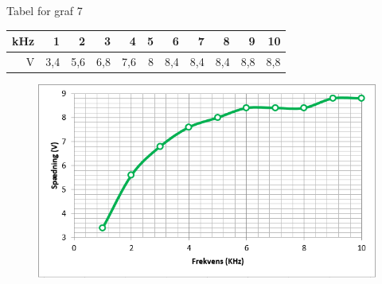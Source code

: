 Tabel for graf 7

\begin{tabular}{|r|r|r|r|r|r|r|r|r|r|r|} \hline
kHz & 1 & 2 & 3 & 4 & 5 & 6 & 7 & 8 & 9 & 10 \\ \hline
V & 3,4 & 5,6 & 6,8 & 7,6 & 8 & 8,4 & 8,4 & 8,4 & 8,8 & 8,8 \\ \hline
\end{tabular}

\begin{figure}[H]
\includegraphics[scale=1]{Graf7}
\end{figure}
